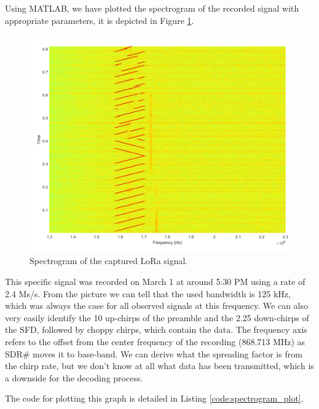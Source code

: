 \documentclass{icmmcm}
\begin{document}
Using MATLAB, we have plotted the spectrogram of the recorded signal with appropriate parameters, it is depicted in Figure \ref{fig:Fig1}.

\begin{figure}[h]
  \begin{center}
    \includegraphics[width=12 cm]{Figures/1}
  \end{center}
  \caption{Spectrogram of the captured LoRa signal.}
  \label{fig:Fig1}
\end{figure}

This specific signal was recorded on March 1 at around 5:30 PM using a rate of 2.4 Ms/s. From the picture we can tell that the used bandwidth is 125 kHz, which was always the case for all observed signals at this frequency. We can also very easily identify the 10 up-chirps of the preamble and the 2.25 down-chirps of the SFD, followed by choppy chirps, which contain the data. The frequency axis refers to the offset from the center frequency of the recording (868.713 MHz) as SDR\# moves it to base-band. We can derive what the spreading factor is from the chirp rate, but we don't know at all what data has been transmitted, which is a downside for the decoding process.

The code for plotting this graph is detailed in Listing \ref{code:spectrogram_plot}.
\end{document}
